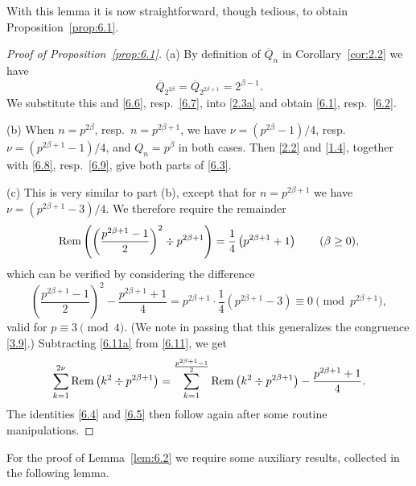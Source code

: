 \documentclass{amsart}
\theoremstyle{plain}
\numberwithin{equation}{section}
\begin{document}
With this lemma it is now straightforward, though tedious, to obtain 
Proposition~\ref{prop:6.1}.

\begin{proof}[Proof of Proposition~\ref{prop:6.1}]
(a) By definition of $\overline{Q}_n$ in Corollary~\ref{cor:2.2} we have
\[
\overline{Q}_{2^{2\beta}} = \overline{Q}_{2^{2\beta+1}} = 2^{\beta-1}.
\]
We substitute this and \eqref{6.6}, resp.\ \eqref{6.7}, into \eqref{2.3a} and 
obtain \eqref{6.1}, resp.\ \eqref{6.2}.

(b) When $n=p^{2\beta}$, resp.\ $n=p^{2\beta+1}$, we have 
$\nu=(p^{2\beta}-1)/4$, resp.\ $\nu=(p^{2\beta+1}-1)/4$, and $Q_n=p^{\beta}$
in both cases. Then \eqref{2.2} and \eqref{1.4}, together with \eqref{6.8},
resp.\ \eqref{6.9}, give both parts of \eqref{6.3}.

(c) This is very similar to part (b), except that for $n=p^{2\beta+1}$ we have
$\nu=(p^{2\beta+1}-3)/4$. We therefore require the remainder
\begin{equation}\label{6.11a}
{\rm Rem}\left(\left(\frac{p^{2\beta+1}-1}{2}\right)^2\div p^{2\beta+1}\right)
=\frac{1}{4}\left(p^{2\beta+1}+1\right)\qquad (\beta\geq 0),
\end{equation}
which can be verified by considering the difference
\[
\left(\frac{p^{2\beta+1}-1}{2}\right)^2-\frac{p^{2\beta+1}+1}{4}
=p^{2\beta+1}\cdot\frac{1}{4}\left(p^{2\beta+1}-3\right)
\equiv 0\pmod{p^{2\beta+1}},
\]
valid for $p\equiv 3\pmod{4}$. (We note in passing that this generalizes the 
congruence \eqref{3.9}.) Subtracting \eqref{6.11a} from \eqref{6.11}, we get
\[
\sum_{k=1}^{2\nu}{\rm Rem}\left(k^2\div p^{2\beta+1}\right)
=\sum_{k=1}^{\frac{p^{2\beta+1}-1}{2}}{\rm Rem}\left(k^2\div p^{2\beta+1}\right)
-\frac{p^{2\beta+1}+1}{4}.
\]
The identities \eqref{6.4} and \eqref{6.5} then follow again after some 
routine manipulations.
\end{proof}

For the proof of Lemma~\ref{lem:6.2} we require some auxiliary results, 
collected in the following lemma.
\end{document}
